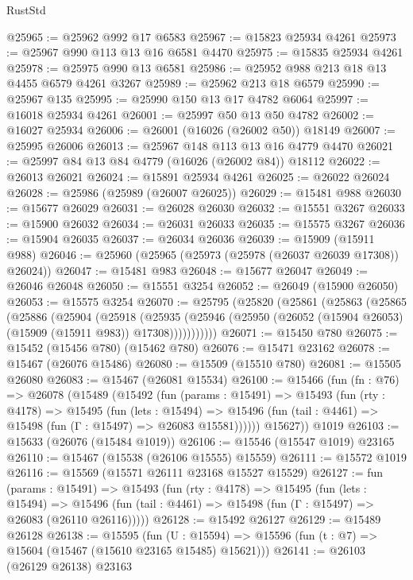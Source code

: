 \begin{lexlean}{RustStd}
\begin{coremodule}
@25965 := @25962 @992 @17 @6583
@25967 := @15823 @25934 @4261
@25973 := @25967 @990 @113 @13 @16 @6581 @4470
@25975 := @15835 @25934 @4261
@25978 := @25975 @990 @13 @6581
@25986 := @25952 @988 @213 @18 @13 @4455 @6579 @4261 @3267
@25989 := @25962 @213 @18 @6579
@25990 := @25967 @135
@25995 := @25990 @150 @13 @17 @4782 @6064
@25997 := @16018 @25934 @4261
@26001 := @25997 @50 @13 @50 @4782
@26002 := @16027 @25934
@26006 := @26001 (@16026 (@26002 @50)) @18149
@26007 := @25995 @26006
@26013 := @25967 @148 @113 @13 @16 @4779 @4470
@26021 := @25997 @84 @13 @84 @4779 (@16026 (@26002 @84)) @18112
@26022 := @26013 @26021
@26024 := @15891 @25934 @4261
@26025 := @26022 @26024
@26028 := @25986 (@25989 (@26007 @26025))
@26029 := @15481 @988
@26030 := @15677 @26029
@26031 := @26028 @26030
@26032 := @15551 @3267
@26033 := @15900 @26032
@26034 := @26031 @26033
@26035 := @15575 @3267
@26036 := @15904 @26035
@26037 := @26034 @26036
@26039 := @15909 (@15911 @988)
@26046 := @25960 (@25965 (@25973 (@25978 (@26037 @26039 @17308)) @26024))
@26047 := @15481 @983
@26048 := @15677 @26047
@26049 := @26046 @26048
@26050 := @15551 @3254
@26052 := @26049 (@15900 @26050)
@26053 := @15575 @3254
@26070 := @25795
    (@25820
      (@25861
        (@25863
          (@25865
            (@25886
              (@25904
                (@25918
                  (@25935
                    (@25946 (@25950 (@26052 (@15904 @26053) (@15909 (@15911 @983)) @17308)))))))))))
@26071 := @15450 @780
@26075 := @15452 (@15456 @780) (@15462 @780)
@26076 := @15471 @23162
@26078 := @15467 (@26076 @15486)
@26080 := @15509 (@15510 @780)
@26081 := @15505 @26080
@26083 := @15467 (@26081 @15534)
@26100 := @15466
    (fun (fn : @76) =>
    @26078
      (@15489
        (@15492
          (fun (params : @15491) =>
          @15493
            (fun (rty : @4178) =>
            @15495
              (fun (lets : @15494) =>
              @15496 (fun (tail : @4461) => @15498 (fun (Γ : @15497) => @26083 @15581))))))
        @15627))
    @1019
@26103 := @15633 (@26076 (@15484 @1019))
@26106 := @15546 (@15547 @1019) @23165
@26110 := @15467 (@15538 (@26106 @15555) @15559)
@26111 := @15572 @1019
@26116 := @15569 (@15571 @26111 @23168 @15527 @15529)
@26127 := fun (params : @15491) =>
  @15493
    (fun (rty : @4178) =>
    @15495
      (fun (lets : @15494) =>
      @15496 (fun (tail : @4461) => @15498 (fun (Γ : @15497) => @26083 (@26110 @26116)))))
@26128 := @15492 @26127
@26129 := @15489 @26128
@26138 := @15595
    (fun (U : @15594) => @15596 (fun (t : @7) => @15604 (@15467 (@15610 @23165 @15485) @15621)))
@26141 := @26103 (@26129 @26138) @23163

\end{coremodule}
\end{lexlean}
